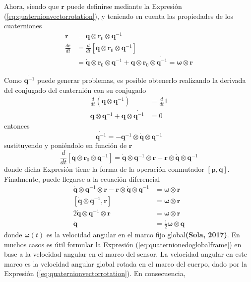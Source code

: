 Ahora, siendo que $\bm{r}$ puede definirse mediante la Expresión (\ref{eq:quaternionvectorrotation}), y teniendo en cuenta las propiedades de los cuaterniones
\begin{align}
    \bm{r} &= \bm{q}\otimes \bm{r}_0 \otimes \bm{q}^{-1} \\
    \frac{d\bm{r}}{dt} &= \frac{d}{dt}\left[\bm{q}\otimes\bm{r}_0\otimes\bm{q}^{-1}\right] \\
    &= \dot{\bm{q}}\otimes\bm{r}_0\otimes\bm{q}^{-1} + \bm{q}\otimes\bm{r}_0\otimes\dot{\bm{q}^{-1}} = \bm{\omega}\otimes\bm{r}
\end{align}

Como $\dot{\bm{q}^{-1}}$ puede generar problemas, es posible obtenerlo realizando la derivada del conjugado del cuaternión con su conjugado
\begin{align}
    \frac{d}{dt}\left(\bm{q}\otimes\bm{q}^{-1}\right) &= \frac{d}{dt}1 \\
    \dot{\bm{q}}\otimes\bm{q}^{-1} + \bm{q}\otimes\dot{\bm{q}^{-1}} &= 0
\end{align}
entonces
\begin{equation}
    \dot{\bm{q}^{-1}} = -\bm{q}^{-1}\otimes\dot{\bm{q}}\otimes\bm{q}^{-1}
\end{equation}
sustituyendo y poniéndolo en función de $\bm{r}$
\begin{equation}
        \frac{d}{dt}\left[\bm{q}\otimes\bm{r}_0\otimes\bm{q}^{-1}\right] = \dot{\bm{q}}\otimes\bm{q}^{-1}\otimes\bm{r} - \bm{r}\otimes\dot{\bm{q}}\otimes\bm{q}^{-1}
\end{equation}
donde dicha Expresión tiene la forma de la operación conmutador $\left[\bm{p},\bm{q}\right]$. Finalmente, puede llegarse a la ecuación diferencial
\begin{align}
    \dot{\bm{q}}\otimes\bm{q}^{-1}\otimes\bm{r} - \bm{r}\otimes\dot{\bm{q}}\otimes\bm{q}^{-1} &= \bm{\omega}\otimes\bm{r} \\
    \left[\dot{\bm{q}}\otimes\bm{q}^{-1},\bm{r}\right] &= \bm{\omega}\otimes\bm{r} \\
    2\dot{\bm{q}}\otimes\bm{q}^{-1}\otimes\bm{r} &= \bm{\omega}\otimes\bm{r} \\
    \dot{\bm{q}} &= \frac{1}{2}\bm{\omega}\otimes\bm{q}
    \label{eq:quaternionedoglobalframe}
\end{align}
donde $\bm{\omega}(t)$ es la velocidad angular en el marco fijo global\textbf{(Sola, 2017)}. En muchos casos es útil formular la Expresión (\ref{eq:quaternionedoglobalframe}) en base a la velocidad angular en el marco del sensor. La velocidad angular en este marco es la velocidad angular global rotada en el marco del cuerpo, dado por la Expresión (\ref{eq:quaternionvectorrotation}). En consecuencia,

